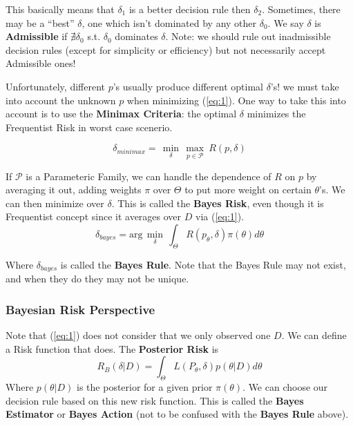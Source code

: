 \documentclass[]{article}
\theoremstyle{mattstyle}
\theoremstyle{definition}
\begin{document}
This basically means that \(\delta_1\) is a better decision rule then \(\delta_2\). Sometimes, there may be a ``best'' \(\delta\), one which isn't dominated by any other \(\delta_0\). We say \(\delta\) is \textbf{Admissible} if $\nexists \delta_0$ s.t. $\delta_0$ dominates $\delta$. Note: we should rule out inadmissible decision rules (except for simplicity or efficiency) but not necessarily accept Admissible ones!

Unfortunately, different \(p\)'s usually produce different optimal \(\delta\)'s! we must take into account the unknown \(p\) when minimizing (\ref{eq:1}). One way to take this into account is to use the \textbf{Minimax Criteria}: the optimal \(\delta\) minimizes the Frequentist Risk in worst case scenerio.

\begin{equation}\delta_{minimax} = \,\min\limits_{\delta}\,\max\limits_{p \in \mathcal{P}}\ R(p,\delta)
\end{equation}

If \(\mathcal{P}\) is a Parameteric Family, we can handle the dependence of \(R\) on \(p\) by averaging it out, adding weights \(\pi\) over $\Theta$ to put more weight on certain $\theta$'s. We can then minimize over \(\delta\). This is called the \textbf{Bayes Risk}, even though it is Frequentist concept since it averages over $D$ via (\ref{eq:1}).
\begin{equation}\label{eq:3}
\delta_{bayes}= \text{arg}\,\min\limits_{\delta}\,\int_{\Theta}^{}R(p_\theta,\delta)\pi(\theta)d\theta
\end{equation}

Where $\delta_{bayes}$ is called the \textbf{Bayes Rule}. Note that the Bayes Rule may not exist, and when they do they may not be unique.

\subsubsection{Bayesian Risk Perspective} 

Note that (\ref{eq:1}) does not consider that we only observed one \(D\). We can define a Risk function that does. The \textbf{Posterior Risk} is
\begin{equation}\label{eq:2}R_B(\delta|D) = \int_{\Theta}^{}L(P_{\theta},\delta)p(\theta|D)d\theta
\end{equation}
Where $p(\theta|D)$ is the posterior for a given prior $\pi(\theta)$. We can choose our decision rule based on this new risk function. This is called the \textbf{Bayes Estimator} or \textbf{Bayes Action} (not to be confused with the \textbf{Bayes Rule} above).
\end{document}

